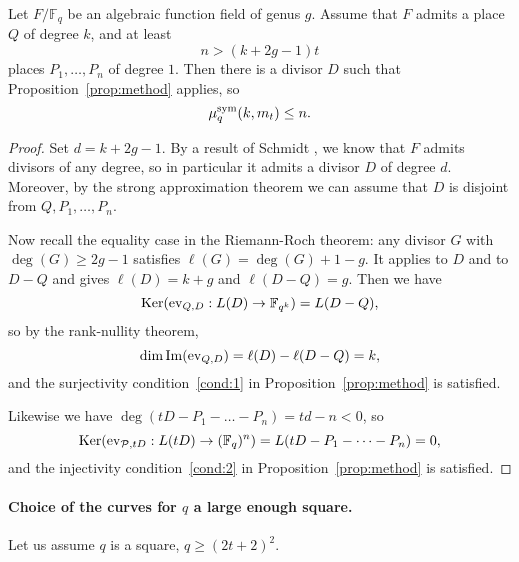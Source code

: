 \documentclass[11pt]{article}
\begin{document}
\begin{prop}
\label{prop:numerical}
Let $F/\mathbb{F}_{q}$ be an algebraic function field of genus $g$.
Assume that $F$ admits a place $Q$ of degree $k$, and at least
\[
  n > (k+2g-1)t
\]
places $P_1,\dots,P_n$ of degree $1$.
Then there is a divisor $D$ such that Proposition~\ref{prop:method} applies, so
\[ \mu^{\textrm{sym}}_q(k,m_t)\leq n. \]
\end{prop}
\begin{proof}
Set $d=k+2g-1$.
By a result of Schmidt \cite[Cor.~5.1.11]{Stichtenoth09}, we know that $F$ admits divisors of any degree,
so in particular it admits a divisor $D$ of degree $d$. Moreover, by the strong approximation theorem \cite[Thm.~1.6.5]{Stichtenoth09}
we can assume that $D$ is disjoint from $Q,P_1,\dots,P_n$.

Now recall the equality case \cite[Thm.~1.5.17]{Stichtenoth09} in the Riemann-Roch theorem: any divisor $G$ with $\deg(G)\geq 2g-1$ satisfies $\ell(G)=\deg(G)+1-g$.
It applies to $D$ and to $D-Q$ and gives $\ell(D)=k+g$ and $\ell(D-Q)=g$. 
Then we have
\[
  \operatorname{Ker}(\operatorname{ev}_{Q, D}:L(D)\to\mathbb{F}_{q^k}) = L(D-Q),
\]
so by the rank-nullity theorem,
\[
  \dim\operatorname{Im}(\operatorname{ev}_{Q, D}) = \ell(D) - \ell(D-Q)=k,
\]
and the surjectivity condition~\ref{cond:1} in Proposition~\ref{prop:method} is satisfied.

Likewise we have $\deg(tD-P_1-\dots-P_n)=td-n<0$, so
 \[
  \operatorname{Ker}(\operatorname{ev}_{\mathcal{P}, tD}:L(tD)\to(\mathbb{F}_{q})^n) = L(tD-P_1-\dots-P_n)=0,
\]
and the injectivity condition~\ref{cond:2} in Proposition~\ref{prop:method} is satisfied.
\end{proof}

\paragraph{Choice of the curves for $q$ a large enough square.}

Let us assume $q$ is a square, $q\geq(2t+2)^2$.
\end{document}
